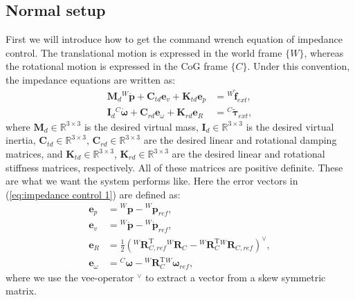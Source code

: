 \subsection{Normal setup}
First we will introduce how to get the command wrench equation of impedance control.
The translational motion is expressed in the world frame $\{W\}$, whereas the rotational motion is expressed in the CoG frame $\{C\}$. Under this convention, the impedance equations are written as:
\begin{subequations}
\label{eq:impedance control 1}
\begin{align}
    {\boldsymbol{M}_{d}}{^W\!\ddot{\boldsymbol{p}}}+{\boldsymbol{C}_{td}}{\boldsymbol{e}_v}+{\boldsymbol{K}_{td}}{\boldsymbol{e}_p}&={^W\!\boldsymbol{\tilde{f}}_{ext}}, \\[2pt]
    {\boldsymbol{I}_{d}}{^C\!\dot{\boldsymbol{\omega}}}+{\boldsymbol{C}_{rd}}{\boldsymbol{e}_\omega}+{\boldsymbol{K}_{rd}}{\boldsymbol{e}_R}&={^C\!\boldsymbol{\tilde{\tau}}_{ext}},
\end{align}
\end{subequations}
where ${\boldsymbol{M}_{d}}\in \mathbb{R}^{3\times3}$ is the desired virtual mass, ${\boldsymbol{I}_{d}}\in \mathbb{R}^{3\times3}$ is the desired virtual inertia, ${\boldsymbol{C}_{td}}\in \mathbb{R}^{3\times3}$, ${\boldsymbol{C}_{rd}}\in \mathbb{R}^{3\times3}$ are the desired linear and rotational damping matrices, and ${\boldsymbol{K}_{td}}\in \mathbb{R}^{3\times3}$, ${\boldsymbol{K}_{rd}}\in \mathbb{R}^{3\times3}$ are the desired linear and rotational stiffness matrices, respectively. All of these matrices are positive definite. These are what we want the system performs like. Here the error vectors in (\ref{eq:impedance control 1}) are defined as:
\begin{subequations}
\label{eq:error of rotation}
\begin{align}
    {\boldsymbol{e}_p}&={^W\!\boldsymbol{p}}-{^W\!\boldsymbol{p}_{ref}}, \\[2pt]
    {\boldsymbol{e}_v}&={^W\!\dot{\boldsymbol{p}}}-{^W\!\dot{\boldsymbol{p}}_{ref}}, \\[2pt]
    {\boldsymbol{e}_R}&=\frac{1}{2}({^W\!\boldsymbol{R}^{\mathrm{T}}_{C,ref}}{^W\!\boldsymbol{R}_{C}}-{^W\!\boldsymbol{R}^{\mathrm{T}}_{C}}{^W\!\boldsymbol{R}_{C,ref}})^\vee, \\[2pt]
    {\boldsymbol{e}_\omega}&={^C\!\boldsymbol{\omega}}-{^W\!\boldsymbol{R}^{\mathrm{T}}_{C}}{^W\!\boldsymbol{\omega}}_{ref},
\end{align}
\end{subequations}
where we use the vee-operator $^\vee$ to extract a vector from a skew symmetric matrix.

